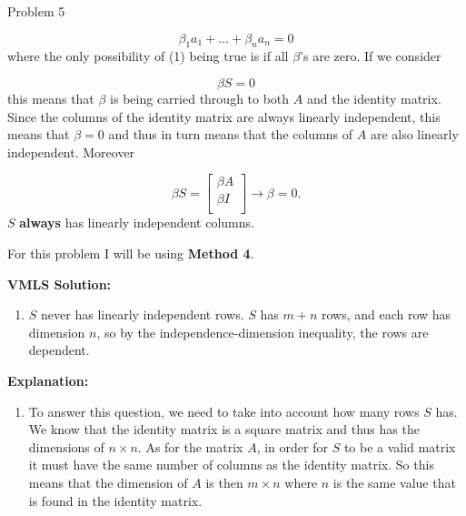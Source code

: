 \begin{problem}{Problem 5}
\begin{highlight}
\begin{enumerate}[label = (\alph*)]
            \setcounter{equation}{0}
            \begin{equation}
                \beta_{1}a_{1} + \dots + \beta_{n}a_{n} = 0
            \end{equation}
            where the only possibility of (1) being true is if all $\beta$'s are zero. If we consider
    
            \begin{equation}
                \beta S = 0
            \end{equation}
            this means that $\beta$ is being carried through to both $A$ and the identity matrix. Since the columns of the identity matrix are always linearly independent, this means that $\beta = 0$ and
            thus in turn means that the columns of $A$ are also linearly independent. Moreover 
    
            \begin{equation}
                \beta S = 
                \begin{bmatrix}
                    \beta A \\
                    \beta I \\
                \end{bmatrix}
                \rightarrow \beta = 0.
            \end{equation}
            $S$ \textbf{always} has linearly independent columns.
        \end{enumerate}

    \end{highlight}

    \begin{highlight}
        For this problem I will be using \textbf{Method 4}. \vspace*{1em}

        \noindent \textbf{VMLS Solution:}

        \begin{enumerate}[label = (\alph*), start = 2]
            \item $S$ never has linearly independent rows. $S$ has $m+n$ rows, and each row has dimension $n$, so by the independence-dimension inequality, the rows are dependent.
        \end{enumerate}

        \noindent \textbf{Explanation:}

        \begin{enumerate}[label = (\alph*), start = 2]
            \item To answer this question, we need to take into account how many rows $S$ has. We know that the identity matrix is a square matrix and thus has the dimensions of $n \times n$. As for the matrix 
            $A$, in order for $S$ to be a valid matrix it must have the same number of columns as the identity matrix. So this means that the dimension of $A$ is then $m \times n$ where $n$ is the same value
            that is found in the identity matrix. 
    

\end{enumerate}
\end{highlight}
\end{problem}
